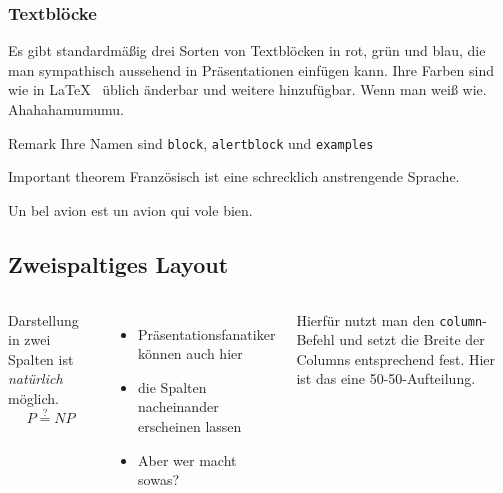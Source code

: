 \begin{frame}
    \frametitle{Textblöcke}
    
    Es gibt standardmäßig drei Sorten von Textblöcken in rot, grün und blau, die man sympathisch aussehend in Präsentationen einfügen kann. Ihre Farben sind wie in \LaTeX~ üblich änderbar und weitere hinzufügbar. Wenn man weiß wie. \alert{Ahahahamumumu}.
    
    \begin{block}{Remark}
    Ihre Namen sind \texttt{block}, \texttt{alertblock} und \texttt{examples}
    \end{block}
    
    \begin{alertblock}{Important theorem}
    Französisch ist eine schrecklich anstrengende Sprache.
    \end{alertblock}
    
    \begin{examples}
    Un bel avion est un avion qui vole bien.
    \end{examples}
\end{frame}

\subsection{Zweispaltiges Layout}
\begin{frame}
    \begin{columns}
    
    Darstellung in zwei Spalten ist \textit{natürlich} möglich.
    $$P\stackrel{?}{=} NP$$
    \begin{itemize}
    \item Präsentationsfanatiker können auch hier
    \item die Spalten nacheinander erscheinen lassen
    \item Aber wer macht sowas?
    \end{itemize}
    
    \pause
    Hierfür nutzt man den \texttt{column}-Befehl und setzt die Breite der Columns entsprechend fest. Hier ist das eine 50-50-Aufteilung.
    \end{columns}

\end{frame}

